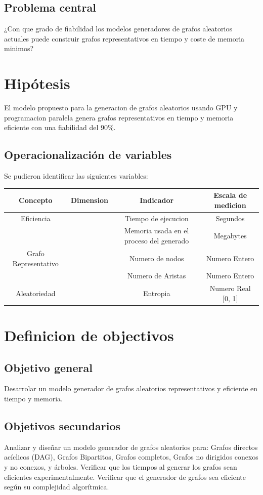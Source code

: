 \documentclass[11pt]{extarticle}
\begin{document}
  \subsection{Problema central}
     ¿Con que grado de fiabilidad los modelos generadores de grafos aleatorios actuales puede construir grafos representativos en tiempo y coste de memoria minimos? 

\section{Hip\'otesis}
  El modelo propuesto para la generacion de grafos aleatorios usando GPU y programacion paralela 
  genera grafos representativos en tiempo y memoria eficiente con una fiabilidad del 90\%.

  \subsection{Operacionalizaci\'on de variables}
  Se pudieron identificar las siguientes variables:\hfill \break \break
  \begin{tabular}{||c c c c||}
    \hline
    Concepto & Dimension & Indicador & Escala de medicion\\
    \hline
    Eficiencia &  & Tiempo de ejecucion & Segundos\\
              &   & Memoria usada en el proceso del generado & Megabytes\\
    \hline
    Grafo Representativo & & Numero de nodos &  Numero Entero\\ 
              &   & Numero de Aristas & Numero Entero\\
    \hline
    Aleatoriedad & & Entropia  & Numero Real [0, 1]\\
    \hline
  \end{tabular}

\section{Definicion de objectivos}
  \subsection{Objetivo general}
  Desarrolar un modelo generador de grafos aleatorios representativos y eficiente en tiempo y memoria.
  \subsection{Objetivos secundarios}
      \begin{itemize}
        \guion Analizar y diseñar un modelo generador de grafos aleatorios para: Grafos directos acíclicos (DAG), Grafos Bipartitos, Grafos completos, Grafos no dirigidos conexos y no conexos, y árboles.
        \guion Verificar que los tiempos al generar los grafos sean eficientes experimentalmente.
        \guion Verificar que el generador de grafos sea eficiente según su complejidad algorítmica.
      \end{itemize}
\end{document}
